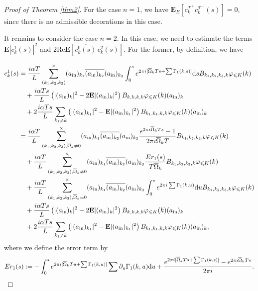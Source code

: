 \documentclass[UTF-8,reqno]{amsart}
\numberwithin{equation}{section}
\theoremstyle{definition}
\def\dif{{\mathord{{\rm d}}}}
\def\leq{\leqslant}
\def\dif{{\mathord{{\rm d}}}}
\def\leq{\leqslant}
\begin{document}
\begin{proof}[Proof of Theorem \ref{thm2}]
 For the case $n=1$, we have $\mathbf{E}_E[c^{\mathcal{T}^+}_kc^{\mathcal{T}^-}_k(s)]=0$,  since there is no admissible  decorations in this case.

 It remains to consider the case $n=2$. In this case, we need to estimate the terms $\mathbf{E}|c^1_k(s)|^2$ and $2\mathrm{Re}\mathbf{E}\left[\overline{c^0_k(s)}\, c^2_k(s)\right]$. For the former, by definition, we have
 
\begin{align}
c_{k}^{1}(s)&=\frac{i\alpha T}{L}  \sum\limits_{(k_1,k_2, k_{3})}^{\times} (a_{\rm in})_{k_1}\overline {(a_{\rm in})_{k_2}}  (a_{\rm in})_{k_3} \int_0^se^{2\pi i[\overline\Omega_kTs+\sum\Gamma_1(k,s)]}\dif sB_{k_1,k_2,k_3,k}\varphi_{\leq K}(k)\notag\\
&\quad+\frac{i\alpha Ts}{L} \left(|(a_{\rm in})_{k}|^2 -2\mathbf{E}|(a_{\rm in})_{k}|^2  \right) B_{k,k,k,k}\varphi_{\leq K}(k) (a_{\rm in})_{k}\notag\\
&\quad+2\frac{i\alpha Ts}{L}\sum_{k_1\neq k}\left(|(a_{\rm in})_{k_1}|^2 -\mathbf{E}|(a_{\rm in})_{k_1}|^2  \right) B_{k_1,k_1,k,k}\varphi_{\leq K}(k) (a_{\rm in})_{k}\notag\\
&=\frac{i\alpha T}{L} \sum\limits_{(k_1,k_2, k_{3}),\overline \Omega_k\neq 0}^{\times} (a_{\rm in})_{k_1}\overline {(a_{\rm in})_{k_2}}  (a_{\rm in})_{k_3} \frac{e^{2\pi i\overline \Omega_kTs}-1}{2\pi i\overline\Omega_kT}B_{k_1,k_2,k_3,k}\varphi_{\leq K}(k)\notag\\
&\quad+\frac{i\alpha T}{L}  \sum\limits_{(k_1,k_2, k_{3}),\overline \Omega_k\neq 0}^{\times} (a_{\rm in})_{k_1}\overline {(a_{\rm in})_{k_2}}  (a_{\rm in})_{k_3}\frac{Er_1(s)}{T\overline\Omega_k}B_{k_1,k_2,k_3,k}\varphi_{\leq K}(k)\notag\\
&\quad+\frac{i\alpha T}{L} \sum\limits_{(k_1,k_2, k_{3}),\overline \Omega_k= 0}^{\times} (a_{\rm in})_{k_1}\overline {(a_{\rm in})_{k_2}}  (a_{\rm in})_{k_3} \int_0^se^{2\pi i\sum\Gamma_1(k,u)}\dif uB_{k_1,k_2,k_3,k}\varphi_{\leq K}(k)\notag\\
&\quad+\frac{i\alpha Ts}{L} \left(|(a_{\rm in})_{k}|^2 -2\mathbf{E}|(a_{\rm in})_{k}|^2  \right) B_{k,k,k,k}\varphi_{\leq K}(k) (a_{\rm in})_{k}\notag\\
&\quad+2\frac{i\alpha Ts}{L}\sum_{k_1\neq k}\left(|(a_{\rm in})_{k_1}|^2 -\mathbf{E}|(a_{\rm in})_{k_1}|^2  \right) B_{k_1,k_1,k,k}\varphi_{\leq K}(k) (a_{\rm in})_{k},\label{bd:ck1}
\end{align}
where we define the error term by
\begin{align}
    Er_1(s):= -\int_0^se^{2\pi i[ \overline\Omega_kTu+\sum\Gamma_1(k,u)]}\sum\partial_u\Gamma_1(k,u)\dif u+ \frac{e^{2\pi i[ \overline\Omega_kTs+\sum\Gamma_1(k,s)]}-e^{2\pi i \overline\Omega_kTs}}{2\pi i}.\notag

\end{align}
\end{proof}
\end{document}
